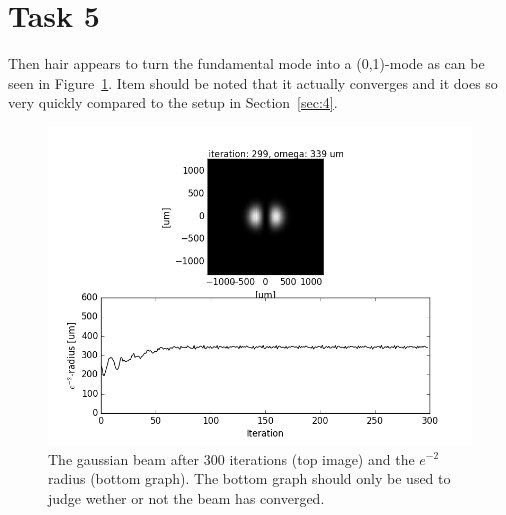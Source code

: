 \documentclass[12pt,a4paper]{article}
\begin{document}
\section{Task 5}\label{sec:5}
Then hair appears to turn the fundamental mode into a (0,1)-mode as can be seen in Figure~\ref{fig:task5}. Item should be noted that it actually converges and it does so very quickly compared to the setup in Section~\ref{sec:4}.
\begin{figure}
  \centering
  \includegraphics[width=\textwidth]{5_gauss_1_0.png}
  \caption{The gaussian beam after 300 iterations (top image) and the $e^{-2}$ radius (bottom graph). The bottom graph should only be used to judge wether or not the beam has converged.}
  \label{fig:task5}
\end{figure}
\end{document}
